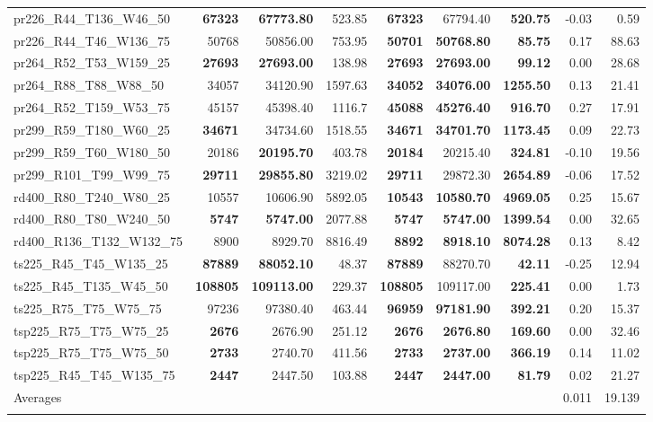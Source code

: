 \documentclass{singlecol-new}
\begin{document}
{\begin{longtable}{lrrrrrrrr}
		pr226\_R44\_T136\_W46\_50 & \textbf{67323} & \textbf{67773.80} & 523.85 & \textbf{67323} & 67794.40 & \textbf{520.75} & -0.03 & 0.59 \\
		pr226\_R44\_T46\_W136\_75 & 50768 & 50856.00 & 753.95 & \textbf{50701} & \textbf{50768.80} & \textbf{85.75} & 0.17 & 88.63 \\
		pr264\_R52\_T53\_W159\_25 & \textbf{27693} & \textbf{27693.00} & 138.98 & \textbf{27693} & \textbf{27693.00} & \textbf{99.12} & 0.00 & 28.68 \\
		pr264\_R88\_T88\_W88\_50 & 34057 & 34120.90 & 1597.63 & \textbf{34052} & \textbf{34076.00} & \textbf{1255.50} & 0.13 & 21.41 \\
		pr264\_R52\_T159\_W53\_75 & 45157 & 45398.40 & 1116.7 & \textbf{45088} & \textbf{45276.40} & \textbf{916.70} & 0.27 & 17.91 \\
		pr299\_R59\_T180\_W60\_25 & \textbf{34671} & 34734.60 & 1518.55 & \textbf{34671} & \textbf{34701.70} & \textbf{1173.45} & 0.09 & 22.73 \\
		pr299\_R59\_T60\_W180\_50 & 20186 & \textbf{20195.70} & 403.78 & \textbf{20184} & 20215.40 & \textbf{324.81} & -0.10 & 19.56 \\
		pr299\_R101\_T99\_W99\_75 & \textbf{29711} & \textbf{29855.80} & 3219.02 & \textbf{29711} & 29872.30 & \textbf{2654.89} & -0.06 & 17.52 \\
		rd400\_R80\_T240\_W80\_25 & 10557 & 10606.90 & 5892.05 & \textbf{10543} & \textbf{10580.70} & \textbf{4969.05} & 0.25 & 15.67 \\
		rd400\_R80\_T80\_W240\_50 & \textbf{5747} & \textbf{5747.00} & 2077.88 & \textbf{5747} & \textbf{5747.00} & \textbf{1399.54} & 0.00 & 32.65 \\
		rd400\_R136\_T132\_W132\_75 & 8900 & 8929.70 & 8816.49 & \textbf{8892} & \textbf{8918.10} & \textbf{8074.28} & 0.13 & 8.42 \\
		ts225\_R45\_T45\_W135\_25 & \textbf{87889} & \textbf{88052.10} & 48.37 & \textbf{87889} & 88270.70 & \textbf{42.11} & -0.25 & 12.94 \\
		ts225\_R45\_T135\_W45\_50 & \textbf{108805} & \textbf{109113.00} & 229.37 & \textbf{108805} & 109117.00 & \textbf{225.41} & 0.00 & 1.73 \\
		ts225\_R75\_T75\_W75\_75 & 97236 & 97380.40 & 463.44 & \textbf{96959} & \textbf{97181.90} & \textbf{392.21} & 0.20 & 15.37 \\
		tsp225\_R75\_T75\_W75\_25 & \textbf{2676} & 2676.90 & 251.12 & \textbf{2676} & \textbf{2676.80} & \textbf{169.60} & 0.00 & 32.46 \\
		tsp225\_R75\_T75\_W75\_50 & \textbf{2733} & 2740.70 & 411.56 & \textbf{2733} & \textbf{2737.00} & \textbf{366.19} & 0.14 & 11.02 \\
		tsp225\_R45\_T45\_W135\_75 & \textbf{2447} & 2447.50 & 103.88 & \textbf{2447} & \textbf{2447.00} & \textbf{81.79} & 0.02 & 21.27 \\
		\hline 
 Averages &  &  &  &  &  &  & 0.011 & 19.139 \\
		\hline \\
	\end{longtable}
	
}
\end{document}
